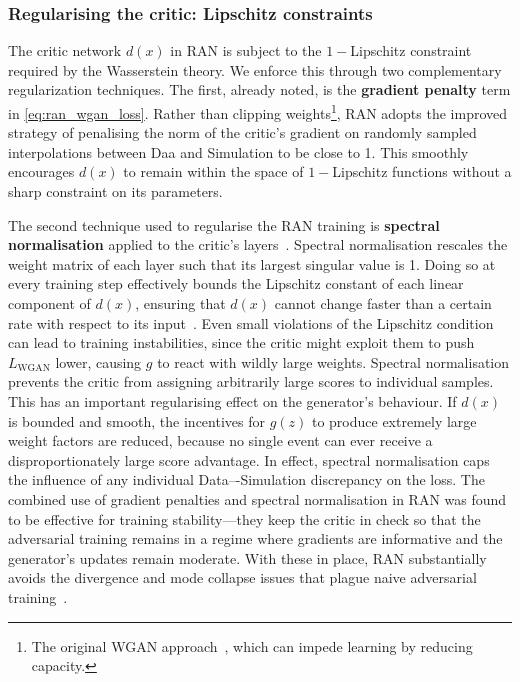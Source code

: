 {{        \subsubsection{Regularising the critic: Lipschitz constraints}
            The critic network $d(x)$ in RAN is subject to the \(1-\)Lipschitz constraint required by the Wasserstein theory.
            We enforce this through two complementary regularization techniques.
            The first, already noted, is the \textbf{gradient penalty} term in \cref{eq:ran_wgan_loss}.
            Rather than clipping weights\footnote{The original WGAN approach~\cite{arjovsky_wasserstein_2017}, which can impede learning by reducing capacity.}, RAN adopts the improved strategy of penalising the norm of the critic’s gradient on randomly sampled interpolations between Daa and Simulation to be close to 1.
            This smoothly encourages $d(x)$ to remain within the space of \(1-\)Lipschitz functions without a sharp constraint on its parameters.
            
            The second technique used to regularise the RAN training is \textbf{spectral normalisation} applied to the critic’s layers~\cite{miyato_spectral_2018}.
            Spectral normalisation rescales the weight matrix of each layer such that its largest singular value is 1.
            Doing so at every training step effectively bounds the Lipschitz constant of each linear component of $d(x)$, ensuring that $d(x)$ cannot change faster than a certain rate with respect to its input~\cite{scaman_lipschitz_2019, Terjek2019AdversarialRegularization, delattre_efficient_2023, mehta_effects_2023, meunier_dynamical_2022}.
            Even small violations of the Lipschitz condition can lead to training instabilities, since the critic might exploit them to push $L_{\text{WGAN}}$ lower, causing $g$ to react with wildly large weights.
            Spectral normalisation prevents the critic from assigning arbitrarily large scores to individual samples.
            This has an important regularising effect on the generator’s behaviour.
            If $d(x)$ is bounded and smooth, the incentives for $g(z)$ to produce extremely large weight factors are reduced, because no single event can ever receive a disproportionately large score advantage.
            In effect, spectral normalisation caps the influence of any individual Data–-Simulation discrepancy on the loss.
            The combined use of gradient penalties and spectral normalisation in RAN was found to be effective for training stability---they keep the critic in check so that the adversarial training remains in a regime where gradients are informative and the generator’s updates remain moderate.
            With these in place, RAN substantially avoids the divergence and mode collapse issues that plague naive adversarial training~\cite{goodfellow_nips_2017, wiatrak_stabilizing_2020, Qian2021SelfNetworks, chen_cde-gan_2021 }.

}}
